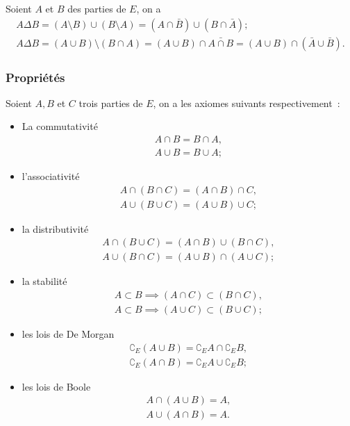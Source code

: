 \begin{prop}
    Soient \(A\) et \(B\) des parties de \(E\), on a 
    \begin{gather}
        A \Delta B = (A\setminus B) \cup (B \setminus A) = (A \cap \bar{B}) \cup (B \cap 
        \bar{A}); \\
        A \Delta B =(A \cup B) \setminus (B \cap A) = (A \cup B) \cap \bar{A \cap B} =(A 
        \cup B) \cap (\bar{A} \cup \bar{B}).
    \end{gather}
\end{prop}

\subsubsection{Propriétés}
\label{chap3-subsubsec:prop}
\begin{axiome}
    Soient \(A, B\) et \(C\) trois parties de \(E\), on a les axiomes suivants 
    respectivement~:
    \begin{itemize}
        \item La commutativité
            \begin{gather}
                A \cap B= B \cap A, \\
                A \cup B=B \cup A;
            \end{gather}
        \item l'associativité
            \begin{gather}
                A \cap (B \cap C)=(A \cap B) \cap C, \\ 
                A \cup (B \cup C)=(A \cup B) \cup C;
            \end{gather}
        \item la distributivité
            \begin{gather}
                A \cap (B \cup C)=(A \cap B) \cup (B \cap C), \\ 
                A \cup (B \cap C)=(A \cup B) \cap (A \cup C);
            \end{gather}
        \item la stabilité
            \begin{gather}
                A \subset B \implies (A \cap C) \subset (B \cap C), \\ 
                A \subset B \implies (A \cup C) \subset (B \cup C);
            \end{gather}
        \item les lois de De Morgan
            \begin{gather}
                \complement_E (A \cup B)=\complement_E A \cap \complement_E B, \\ 
                \complement_E (A \cap B)=\complement_E A \cup \complement_E B;
            \end{gather}
        \item les lois de Boole
            \begin{gather}
                A \cap (A \cup B)=A, \\ 
                A \cup (A \cap B)=A.
            \end{gather}
    \end{itemize}
\end{axiome}
%
